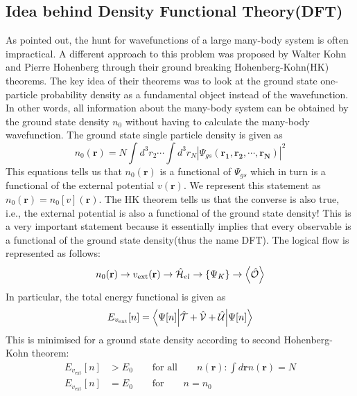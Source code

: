 \subsection{Idea behind Density Functional Theory(DFT)}
As pointed out, the hunt for wavefunctions of a large many-body system is often impractical. A different approach to this problem was proposed by Walter Kohn and Pierre Hohenberg through their ground breaking Hohenberg-Kohn(HK) theorems.\cite{dft_hk} The key idea of their theorems was to look at the ground state one-particle probability density as a fundamental object instead of the wavefunction. In other words, all information about the  many-body system can be obtained by the ground state density $n_0$ without having to calculate the many-body wavefunction. The ground state single particle density is given as
    \begin{equation}\label{ground_state_density}
        n_0(\mathbf{r}) = N\int d^3r_2 \cdots \int d^3r_N |\Psi_{gs}(\mathbf{r_1},\mathbf{r_2}, \cdots,\mathbf{r_N})|^2 
    \end{equation}
This equations tells us that $n_0(\mathbf{r})$ is a functional of $\Psi_{gs}$ which in turn is a functional of the external potential $v(\mathbf{r})$. We represent this statement as $n_0(\mathbf{r}) = n_0[v](\mathbf{r})$. The HK theorem tells us that the converse is also true, i.e., the external potential is also a functional of the ground state density! This is a very important statement because it essentially implies that every observable is a functional of the ground state density(thus the name DFT). The logical flow is represented as follows:
\begin{equation*}
    n_0(\mathbf{r}) \rightarrow v_{\text{ext}}(\mathbf{r}) \rightarrow \hat{\mathcal{H}}_{el} \rightarrow \{\Psi_K\} \rightarrow \expval{\hat{\mathcal{O}}}
\end{equation*}
In particular, the total energy functional is given as 
\begin{equation}\label{energy_functional}
    E_{v_{\text{ext}}}[n] = \ev**{\hat{\mathcal{T}} + \hat{\mathcal{V}} + \hat{\mathcal{U}}}{\Psi[n]}
\end{equation}
This is minimised for a ground state density according to second Hohenberg-Kohn theorem:
\begin{align}
    E_{v_{\text{ext}}}[n] &> E_0 \qquad \text{for all} \qquad n(\mathbf{r}) : \int d\mathbf{r}n(\mathbf{r}) = N \\
    E_{v_{\text{ext}}}[n] &= E_0 \qquad \text{for} \qquad n = n_0
\end{align}
